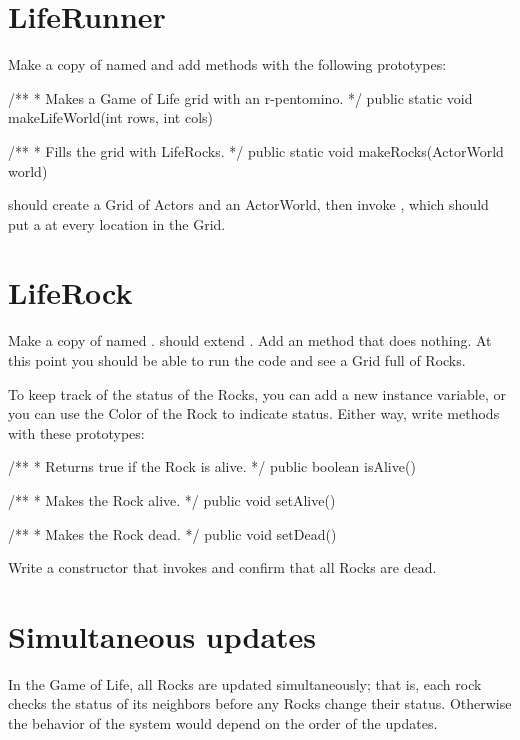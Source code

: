 \section{LifeRunner}

Make a copy of  named  and add methods with the following prototypes:

\begin{code}
    /**
     * Makes a Game of Life grid with an r-pentomino.
     */
    public static void makeLifeWorld(int rows, int cols)

    /**
     * Fills the grid with LifeRocks.
     */
    public static void makeRocks(ActorWorld world)
\end{code}

 should create a Grid of Actors and an ActorWorld, then invoke , which should put a  at every location in the Grid.


\section{LifeRock}

Make a copy of  named .
 should extend .
Add an  method that does nothing.
At this point you should be able to run the code and see a Grid full of Rocks.

To keep track of the status of the Rocks, you can add a new instance variable, or you can use the Color of the Rock to indicate status.
Either way, write methods with these prototypes:

\begin{code}
    /**
     * Returns true if the Rock is alive.
     */
    public boolean isAlive()

    /**
     * Makes the Rock alive.
     */
    public void setAlive()

    /**
     * Makes the Rock dead.
     */
    public void setDead()
\end{code}

Write a constructor that invokes  and confirm that all Rocks are dead.


\section{Simultaneous updates}

In the Game of Life, all Rocks are updated simultaneously; that is, each rock checks the status of its neighbors before any Rocks change their status.
Otherwise the behavior of the system would depend on the order of the updates.

